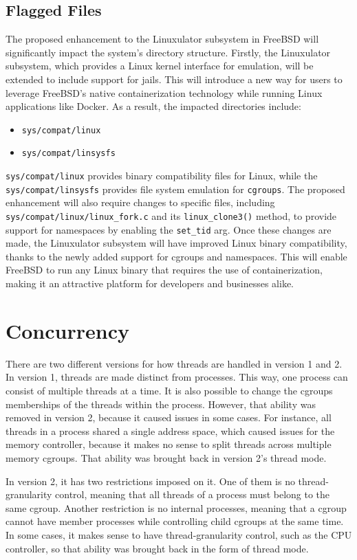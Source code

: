 \documentclass[12pt, dvipsnames, a4paper]{article}
\newcommand{\code}[1]{\texttt{#1}}
\begin{document}
\subsection{Flagged Files}

The proposed enhancement to the Linuxulator subsystem in FreeBSD will significantly impact the system's directory structure. Firstly, the Linuxulator subsystem, which provides a Linux kernel interface for emulation, will be extended to include support for jails. This will introduce a new way for users to leverage FreeBSD's native containerization technology while running Linux applications like Docker.
As a result, the impacted directories include:
\begin{itemize}
	\item \code{sys/compat/linux}
	\item \code{sys/compat/linsysfs}
\end{itemize}

\code{sys/compat/linux} provides binary compatibility files for Linux, while the \code{sys/compat/linsysfs} provides file system emulation for \code{cgroups}. The proposed enhancement will also require changes to specific files, including \code{sys/compat/linux/linux\_fork.c} and its \code{linux\_clone3()} method, to provide support for namespaces by enabling the \code{set\_tid} arg.
Once these changes are made, the Linuxulator subsystem will have improved Linux binary compatibility, thanks to the newly added support for cgroups and namespaces. This will enable FreeBSD to run any Linux binary that requires the use of containerization, making it an attractive platform for developers and businesses alike.

\section{Concurrency}
There are two different versions for how threads are handled in version 1 and 2. In version 1, threads are made distinct from processes. This way, one process can consist of multiple threads at a time. It is also possible to change the cgroups memberships of the threads within the process. However, that ability was removed in version 2, because it caused issues in some cases. For instance, all threads in a process shared a single address space, which caused issues for the memory controller, because it makes no sense to split threads across multiple memory cgroups. That ability was brought back in version 2's thread mode.

In version 2, it has two restrictions imposed on it. One of them is no thread-granularity control, meaning that all threads of a process must belong to the same cgroup. Another restriction is no internal processes, meaning that a cgroup cannot have member processes while controlling child cgroups at the same time. In some cases, it makes sense to have thread-granularity control, such as the CPU controller, so that ability was brought back in the form of thread mode.
\end{document}

